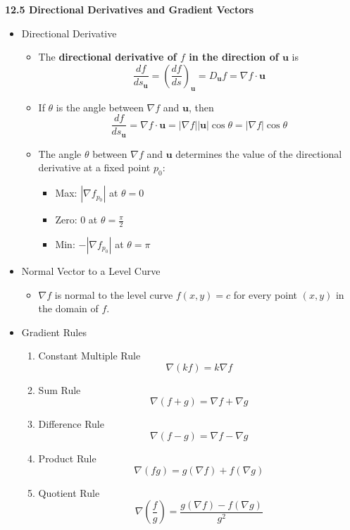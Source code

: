 \documentclass[12pt]{article}
\renewcommand{\vec}[1]{\mathbf{#1}}
\newcommand{\<}{\left<}
\renewcommand{\>}{\right>}
\begin{document}
\newpage

\centerline{\bf 12.5 Directional Derivatives and Gradient Vectors}

\begin{itemize}

\item Directional Derivative

  \begin{itemize}
    \item The \textbf{directional derivative of $f$ in the direction of $\vec{u}$} is 
      \[ 
        \frac{df}{ds_{\vec{u}}} = \left(\frac{df}{ds}\right)_{\vec{u}} = D_{\vec{u}}f = \nabla f \cdot \vec{u}
      \]

    \item If $\theta$ is the angle between $\nabla f$ and $\vec{u}$, then
      \[
        \frac{df}{ds_{\vec{u}}}=\nabla f \cdot \vec{u}=|\nabla f||\vec{u}|\cos \theta = |\nabla f|\cos \theta
      \]

    \item The angle $\theta$ between $\nabla f$ and $\vec{u}$ determines the value of the directional derivative at a fixed point $p_0$:

      \begin{itemize}
        \item Max: $|\nabla f_{p_0}|$ at $\theta = 0$
        \item Zero: $0$ at $\theta = \frac{\pi}{2}$
        \item Min: $-|\nabla f_{p_0}|$ at $\theta = \pi$
      \end{itemize}
  \end{itemize}
  
\item Normal Vector to a Level Curve
  \begin{itemize}
    \item $\nabla f$ is normal to the level curve $f(x,y)=c$ for every point $(x,y)$ in the domain of $f$.
  \end{itemize}

\item Gradient Rules

    \begin{enumerate}
    \item Constant Multiple Rule
    \[\nabla(kf)=k\nabla f\]
    \item Sum Rule
    \[\nabla(f+g)=\nabla f+\nabla g\]
    \item Difference Rule
    \[\nabla(f-g)=\nabla f-\nabla g\]
    \item Product Rule
    \[\nabla(fg)=g(\nabla f)+f(\nabla g)\]
    \item Quotient Rule
    \[\nabla\left(\frac{f}{g}\right)=\frac{g(\nabla f)-f(\nabla g)}{g^2}\]
    \end{enumerate}


\end{itemize}
\end{document}
